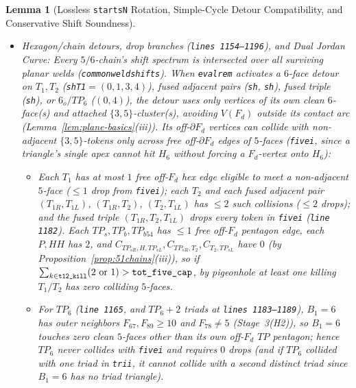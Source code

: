 \documentclass[11pt,reqno]{amsart}
\theoremstyle{plain}
\newtheorem{lemma}[theorem]{Lemma}
\theoremstyle{definition}
\theoremstyle{remark}
\DeclareRobustCommand{\_}{\ifmmode\text{\textunderscore}\else\textunderscore\allowbreak\fi}
\begin{document}
\begin{lemma}[Lossless \texttt{starts\_N} Rotation, Simple-Cycle Detour Compatibility, and Conservative Shift Soundness]
\begin{enumerate}[label=(\roman*),leftmargin=2.2em]
\begin{itemize}[leftmargin=1.5em]
    \item \emph{Hexagon/chain detours, drop branches (\texttt{lines 1154--1196}), and Dual Jordan Curve:} Every $5/6$-chain's shift spectrum is intersected over all surviving planar welds (\texttt{common\_weld\_shifts}). When \texttt{eval\_rem} activates a $6$-face detour on $T_1, T_2$ (\texttt{sh\_T1}$=(0,1,3,4)$), fused adjacent pairs (\texttt{sh\_11}, \texttt{sh\_12}), fused triple (\texttt{sh\_121}), or $6_o/TP_6$ ($(0,4)$), the detour uses only vertices of its own clean $6$-face(s) and attached $\{3,5\}$-cluster(s), avoiding $V(F_d)$ outside its contact arc (Lemma~\ref{lem:plane-basics}(iii)). Its off-$\partial F_d$ vertices can collide with non-adjacent $\{3,5\}$-tokens only across free off-$\partial F_d$ edges of $5$-faces (\texttt{five\_i}, since a triangle's single apex cannot hit $H_6$ without forcing a $F_d$-vertex onto $H_6$):
    \begin{itemize}[leftmargin=1.4em]
      \item Each $T_1$ has at most $1$ free off-$F_d$ hex edge eligible to meet a non-adjacent $5$-face ($\le 1$ drop from \texttt{five\_i}); each $T_2$ and each fused adjacent pair $(T_{1R}, T_{1L})$, $(T_{1R}, T_2)$, $(T_2, T_{1L})$ has $\le 2$ such collisions ($\le 2$ drops); and the fused triple $(T_{1R}, T_2, T_{1L})$ drops \emph{every} token in \texttt{five\_i} (\texttt{line 1182}). Each $TP_s, TP_b, TP_{b54}$ has $\le 1$ free off-$F_d$ pentagon edge, each $P, HH$ has $2$, and $C_{TP_{sR}, H, TP_{sL}}, C_{TP_{sR}, T_2}, C_{T_2, TP_{sL}}$ have $0$ (by Proposition~\ref{prop:51chains}(iii)), so if $\sum_{k \in \texttt{t12\_kill}} (2\text{ or }1) > \texttt{tot\_five\_cap}$, by pigeonhole at least one killing $T_1/T_2$ has zero colliding $5$-faces.
      \item For $TP_6$ (\texttt{line 1165}, and $TP_6 + 2$ triads at \texttt{lines 1183--1189}), $B_1 = 6$ has outer neighbors $F_{67}, F_{89} \ge 10$ and $F_{78} \neq 5$ (Stage~3(H2)), so $B_1 = 6$ touches \emph{zero} clean $5$-faces other than its own off-$F_d$ $TP$ pentagon; hence $TP_6$ never collides with \texttt{five\_i} and requires $0$ drops (and if $TP_6$ collided with one triad in \texttt{tri\_i}, it cannot collide with a second distinct triad since $B_1 = 6$ has no triad triangle).

\end{itemize}
\end{itemize}
\end{enumerate}
\end{lemma}
\end{document}
